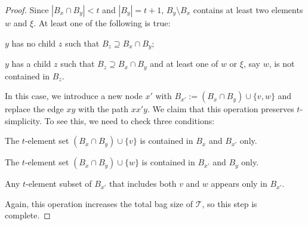 \documentclass[kpfonts]{patmorin}
\theoremstyle{named}
\begin{document}
\begin{proof}
    Since $|B_x\cap B_y|<t$ and $|B_y|=t+1$, $B_y\setminus B_x$ contains at least two elements $w$ and $\xi$.  At least one of the following is true:
    \begin{inparaenum}[(i)]
        \item $y$ has no child $z$ such that $B_z\supseteq B_x\cap B_y$;
        \item $y$ has a child $z$ such that $B_z\supseteq B_x\cap B_y$ and at least one of $w$ or $\xi$, say $w$, is not contained in $B_z$.
    \end{inparaenum}
    In this case, we introduce a new node $x'$ with $B_{x'}:=(B_x\cap B_y)\cup\{v,w\}$ and replace the edge $xy$ with the path $xx'y$.  We claim that this operation preserves $t$-simplicity.  To see this, we need to check three conditions:
    \begin{compactenum}
        \item The $t$-element set $(B_x\cap B_y)\cup\{v\}$ is contained in $B_x$ and $B_{x'}$ only.
        \item The $t$-element set $(B_x\cap B_y)\cup\{w\}$ is contained in $B_{x'}$ and $B_y$ only.
        \item Any $t$-element subset of $B_{x'}$ that includes both $v$ and $w$ appears only in $B_{x'}$.
    \end{compactenum}
    Again, this operation increases the total bag size of $\mathcal{T}$, so this step is complete.
\end{proof}
\end{document}
